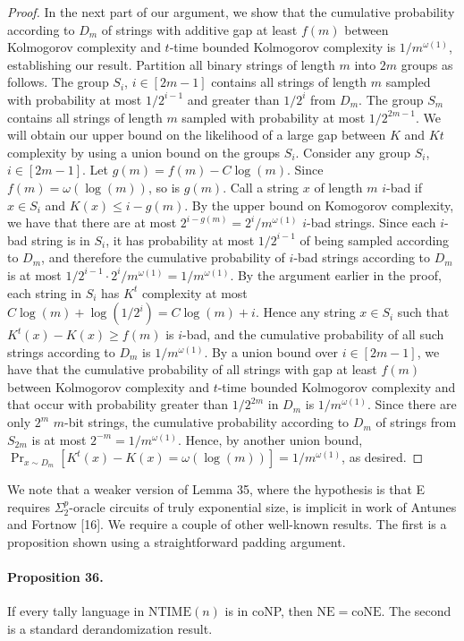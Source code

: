 \begin{proof}
In the next part of our argument, we show that the cumulative probability according to $D_m$ of strings with additive gap at least $f(m)$ between Kolmogorov complexity and $t$-time bounded Kolmogorov complexity is $1/m^{\omega(1)}$, establishing our result.
Partition all binary strings of length $m$ into $2m$ groups as follows. The group $S_i$, $i\in[2m-1]$ contains all strings of length $m$ sampled with probability at most $1/2^{i-1}$ and greater than $1/2^i$ from $D_m$. The group $S_m$ contains all strings of length $m$ sampled with probability at most $1/2^{2m-1}$. We will obtain our upper bound on the likelihood of a large gap between $K$ and $Kt$ complexity by using a union bound on the groups $S_i$.
Consider any group $S_i$, $i\in[2m-1]$. Let $g(m)=f(m)-C\log(m)$. Since $f(m)=\omega(\log(m))$, so is $g(m)$. Call a string $x$ of length $m$ $i$-bad if $x\in S_i$ and $K(x)\le i-g(m)$. By the upper bound on Komogorov complexity, we have that there are at most $2^{i-g(m)}=2^i/m^{\omega(1)}$ $i$-bad strings. Since each $i$-bad string is in $S_i$, it has probability at most $1/2^{i-1}$ of being sampled according to $D_m$, and therefore the cumulative probability of $i$-bad strings according to $D_m$ is at most $1/2^{i-1}\cdot2^i/m^{\omega(1)}=1/m^{\omega(1)}$.
By the argument earlier in the proof, each string in $S_i$ has $K^t$ complexity at most $C\log(m)+\log(1/2^i)=C\log(m)+i$. Hence any string $x\in S_i$ such that $K^t(x)-K(x)\ge f(m)$ is $i$-bad, and the cumulative probability of all such strings according to $D_m$ is $1/m^{\omega(1)}$. By a union bound over $i\in[2m-1]$, we have that the cumulative probability of all strings with gap at least $f(m)$ between Kolmogorov complexity and $t$-time bounded Kolmogorov complexity and that occur with probability greater than $1/2^{2m}$ in $D_m$ is $1/m^{\omega(1)}$. Since there are only $2^m$ $m$-bit strings, the cumulative probability according to $D_m$ of strings from $S_{2m}$ is at most $2^{-m}=1/m^{\omega(1)}$. Hence, by another union bound, $\Pr_{x\sim D_m}[K^t(x)-K(x)=\omega(\log(m))]=1/m^{\omega(1)}$, as desired.\end{proof}
We note that a weaker version of Lemma 35, where the hypothesis is that E requires $\Sigma_2^p$-oracle circuits of truly exponential size, is implicit in work of Antunes and Fortnow [16]. We require a couple of other well-known results. The first is a proposition shown using a straightforward padding argument.
\paragraph{Proposition 36.} If every tally language in $\mathrm{NTIME}(n)$ is in coNP, then $\mathrm{NE}=\mathrm{coNE}$.
The second is a standard derandomization result.
